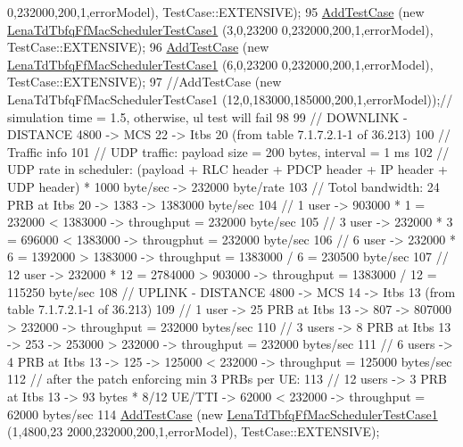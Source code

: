\begin{DoxyCode}
      0,232000,200,1,errorModel), TestCase::EXTENSIVE);
95   \hyperlink{classns3_1_1TestCase_a3718088e3eefd5d6454569d2e0ddd835}{AddTestCase} (\textcolor{keyword}{new} \hyperlink{classLenaTdTbfqFfMacSchedulerTestCase1}{LenaTdTbfqFfMacSchedulerTestCase1} (3,0,23200
      0,232000,200,1,errorModel), TestCase::EXTENSIVE);
96   \hyperlink{classns3_1_1TestCase_a3718088e3eefd5d6454569d2e0ddd835}{AddTestCase} (\textcolor{keyword}{new} \hyperlink{classLenaTdTbfqFfMacSchedulerTestCase1}{LenaTdTbfqFfMacSchedulerTestCase1} (6,0,23200
      0,232000,200,1,errorModel), TestCase::EXTENSIVE);
97   \textcolor{comment}{//AddTestCase (new LenaTdTbfqFfMacSchedulerTestCase1 (12,0,183000,185000,200,1,errorModel));// simulation
       time = 1.5, otherwise, ul test will fail}
98 
99   \textcolor{comment}{// DOWNLINK - DISTANCE 4800 -> MCS 22 -> Itbs 20 (from table 7.1.7.2.1-1 of 36.213)}
100   \textcolor{comment}{// Traffic info}
101   \textcolor{comment}{//   UDP traffic: payload size = 200 bytes, interval = 1 ms}
102   \textcolor{comment}{//   UDP rate in scheduler: (payload + RLC header + PDCP header + IP header + UDP header) * 1000 byte/sec
       -> 232000 byte/rate }
103   \textcolor{comment}{// Totol bandwidth: 24 PRB at Itbs 20 -> 1383 -> 1383000 byte/sec}
104   \textcolor{comment}{// 1 user -> 903000 * 1 = 232000 < 1383000 -> throughput = 232000 byte/sec}
105   \textcolor{comment}{// 3 user -> 232000 * 3 = 696000 < 1383000 -> througphut = 232000 byte/sec}
106   \textcolor{comment}{// 6 user -> 232000 * 6 = 1392000 > 1383000 -> throughput = 1383000 / 6 = 230500 byte/sec}
107   \textcolor{comment}{// 12 user -> 232000 * 12 = 2784000 > 903000 -> throughput =  1383000 / 12 = 115250 byte/sec}
108   \textcolor{comment}{// UPLINK - DISTANCE 4800 -> MCS 14 -> Itbs 13 (from table 7.1.7.2.1-1 of 36.213)}
109   \textcolor{comment}{// 1 user -> 25 PRB at Itbs 13 -> 807 -> 807000 > 232000 -> throughput = 232000 bytes/sec}
110   \textcolor{comment}{// 3 users -> 8 PRB at Itbs 13 -> 253 -> 253000 > 232000 -> throughput = 232000 bytes/sec}
111   \textcolor{comment}{// 6 users -> 4 PRB at Itbs 13 -> 125 -> 125000 < 232000 -> throughput = 125000 bytes/sec}
112   \textcolor{comment}{// after the patch enforcing min 3 PRBs per UE:}
113   \textcolor{comment}{// 12 users -> 3 PRB at Itbs 13 -> 93  bytes * 8/12 UE/TTI  -> 62000 < 232000 -> throughput = 62000 
       bytes/sec}
114   \hyperlink{classns3_1_1TestCase_a3718088e3eefd5d6454569d2e0ddd835}{AddTestCase} (\textcolor{keyword}{new} \hyperlink{classLenaTdTbfqFfMacSchedulerTestCase1}{LenaTdTbfqFfMacSchedulerTestCase1} (1,4800,23
      2000,232000,200,1,errorModel), TestCase::EXTENSIVE);

\end{DoxyCode}
